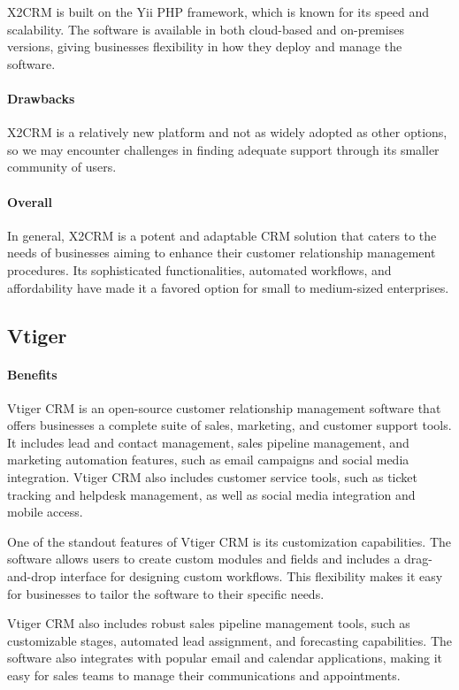 \documentclass{article}
\begin{document}
X2CRM is built on the Yii PHP framework, which is known for its speed and scalability. The software is available in both cloud-based and on-premises versions, giving businesses flexibility in how they deploy and manage the software.

\paragraph{Drawbacks}

X2CRM is a relatively new platform and not as widely adopted as other options, so we may encounter challenges in finding adequate support through its smaller community of users.

\paragraph{Overall}

In general, X2CRM is a potent and adaptable CRM solution that caters to the needs of businesses aiming to enhance their customer relationship management procedures. Its sophisticated functionalities, automated workflows, and affordability have made it a favored option for small to medium-sized enterprises.

\subsection{Vtiger}

\paragraph{Benefits}

Vtiger CRM is an open-source customer relationship management software that offers businesses a complete suite of sales, marketing, and customer support tools. It includes lead and contact management, sales pipeline management, and marketing automation features, such as email campaigns and social media integration. Vtiger CRM also includes customer service tools, such as ticket tracking and helpdesk management, as well as social media integration and mobile access.

One of the standout features of Vtiger CRM is its customization capabilities. The software allows users to create custom modules and fields and includes a drag-and-drop interface for designing custom workflows. This flexibility makes it easy for businesses to tailor the software to their specific needs.

Vtiger CRM also includes robust sales pipeline management tools, such as customizable stages, automated lead assignment, and forecasting capabilities. The software also integrates with popular email and calendar applications, making it easy for sales teams to manage their communications and appointments.
\end{document}
